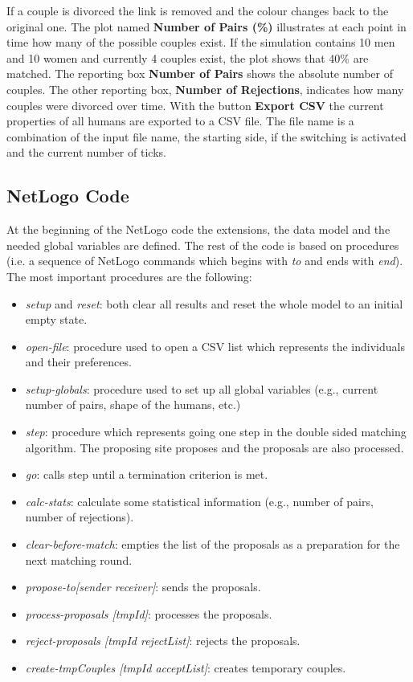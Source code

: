 If a couple is divorced the link is removed and the colour changes back to the original one.
The plot named \textbf{Number of Pairs (\%)} illustrates at each point in time how many of the possible couples exist. 
If the simulation contains 10 men and 10 women and currently 4 couples exist, the plot shows that 40\% are matched.
The reporting box \textbf{Number of Pairs} shows the absolute number of couples.
The other reporting box, \textbf{Number of Rejections}, indicates how many couples were divorced over time.
With the button \textbf{Export CSV} the current properties of all humans are exported to a CSV file.
The file name is a combination of the input file name, the starting side, if the switching is activated and the current number of ticks.

\clearpage
\subsection{NetLogo Code}
At the beginning of the NetLogo code the extensions, the data model and the needed global variables are defined.
The rest of the code is based on procedures (i.e. a sequence of NetLogo commands which begins with \textit{to} and ends with \textit{end}).
The most important procedures are the following:
\begin{itemize}
	\item \textit{setup} and \textit{reset}: both clear all results and reset the whole model to an initial empty state. 
	\item \textit{open-file}: procedure used to open a CSV list which represents the individuals and their preferences. 
	\item \textit{setup-globals}: procedure used to set up all global variables (e.g., current number of pairs, shape of the humans, etc.)
	\item \textit{step}: procedure which represents going one step in the double sided matching algorithm. The proposing site proposes and the proposals are also processed.
	\item \textit{go}: calls step until a termination criterion is met.
	\item \textit{calc-stats}: calculate some statistical information (e.g., number of pairs, number of rejections).
	\item \textit{clear-before-match}: empties the list of the proposals as a preparation for the next matching round.
	\item \textit{propose-to[sender receiver]}: sends the proposals.
	\item \textit{process-proposals [tmpId]}: processes the proposals.
	\item \textit{reject-proposals [tmpId rejectList]}: rejects the proposals.
	\item \textit{create-tmpCouples [tmpId acceptList]}: creates temporary couples.
\end{itemize}

